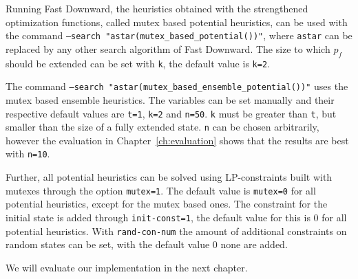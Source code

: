 Running Fast Downward, the heuristics obtained with the strengthened optimization functions, called mutex based potential heuristics, can be used with the command \texttt{--search "astar(mutex\_based\_potential())"}, where \texttt{astar} can be replaced by any other search algorithm of Fast Downward.
The size to which $p_f$ should be extended can be set with \texttt{k}, the default value is \texttt{k=2}.

The command \texttt{--search "astar(mutex\_based\_ensemble\_potential())"} uses the mutex based ensemble heuristics.
The variables can be set manually and their respective default values are \texttt{t=1}, \texttt{k=2} and \texttt{n=50}.
\texttt{k} must be greater than \texttt{t}, but smaller than the size of a fully extended state.
\texttt{n} can be chosen arbitrarily, however the evaluation in Chapter~\ref{ch:evaluation} shows that the results are best with \texttt{n=10}.

Further, all potential heuristics can be solved using LP-constraints built with mutexes through the option \texttt{mutex=1}.
The default value is \texttt{mutex=0} for all potential heuristics, except for the mutex based ones.
The constraint for the initial state is added through \texttt{init-const=1}, the default value for this is $0$ for all potential heuristics.
With \texttt{rand-con-num} the amount of additional constraints on random states can be set, with the default value $0$ none are added.

We will evaluate our implementation in the next chapter.

